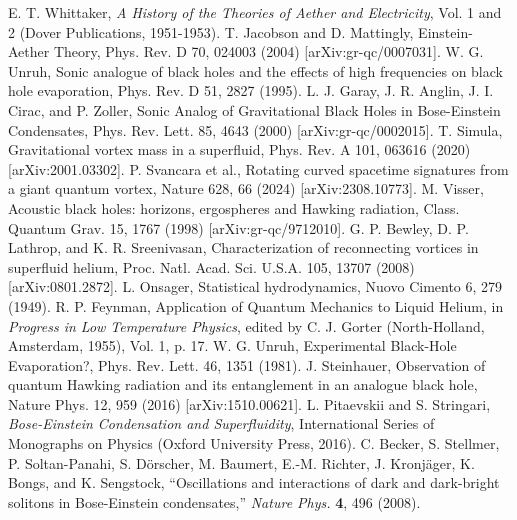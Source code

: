 \documentclass{article}
\begin{document}
\begin{thebibliography}{}
 E. T. Whittaker, \emph{A History of the Theories of Aether and Electricity}, Vol. 1 and 2 (Dover Publications, 1951-1953).
 T. Jacobson and D. Mattingly, Einstein-Aether Theory, Phys. Rev. D 70, 024003 (2004) [arXiv:gr-qc/0007031].
 W. G. Unruh, Sonic analogue of black holes and the effects of high frequencies on black hole evaporation, Phys. Rev. D 51, 2827 (1995).
 L. J. Garay, J. R. Anglin, J. I. Cirac, and P. Zoller, Sonic Analog of Gravitational Black Holes in Bose-Einstein Condensates, Phys. Rev. Lett. 85, 4643 (2000) [arXiv:gr-qc/0002015].
 T. Simula, Gravitational vortex mass in a superfluid, Phys. Rev. A 101, 063616 (2020) [arXiv:2001.03302].
 P. Svancara et al., Rotating curved spacetime signatures from a giant quantum vortex, Nature 628, 66 (2024) [arXiv:2308.10773].
 M. Visser, Acoustic black holes: horizons, ergospheres and Hawking radiation, Class. Quantum Grav. 15, 1767 (1998) [arXiv:gr-qc/9712010].
 G. P. Bewley, D. P. Lathrop, and K. R. Sreenivasan, Characterization of reconnecting vortices in superfluid helium, Proc. Natl. Acad. Sci. U.S.A. 105, 13707 (2008) [arXiv:0801.2872].
 L. Onsager, Statistical hydrodynamics, Nuovo Cimento 6, 279 (1949).
 R. P. Feynman, Application of Quantum Mechanics to Liquid Helium, in \emph{Progress in Low Temperature Physics}, edited by C. J. Gorter (North-Holland, Amsterdam, 1955), Vol. 1, p. 17.
 W. G. Unruh, Experimental Black-Hole Evaporation?, Phys. Rev. Lett. 46, 1351 (1981).
 J. Steinhauer, Observation of quantum Hawking radiation and its entanglement in an analogue black hole, Nature Phys. 12, 959 (2016) [arXiv:1510.00621].
 L. Pitaevskii and S. Stringari, \emph{Bose-Einstein Condensation and Superfluidity}, International Series of Monographs on Physics (Oxford University Press, 2016).
 C. Becker, S. Stellmer, P. Soltan-Panahi, S. D\"{o}rscher, M. Baumert, E.-M. Richter, J. Kronj\"{a}ger, K. Bongs, and K. Sengstock, ``Oscillations and interactions of dark and dark-bright solitons in Bose-Einstein condensates,'' \emph{Nature Phys.} \textbf{4}, 496 (2008).
\end{thebibliography}
\end{document}
